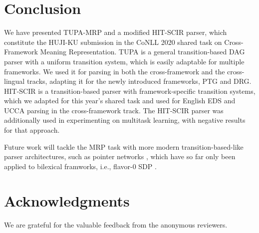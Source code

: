 \documentclass[11pt,a4paper]{article}
\begin{document}
\section{Conclusion}\label{sec:conclusion}
We have presented TUPA-MRP and a modified HIT-SCIR parser, which constitute the HUJI-KU submission in the CoNLL 2020 shared task on Cross-Framework Meaning Representation. TUPA is a general transition-based DAG parser with a uniform transition system, which is easily adaptable for multiple frameworks. We used it for parsing in both the cross-framework and the cross-lingual tracks, adapting it for the newly introduced frameworks, PTG and DRG.  HIT-SCIR is a transition-based parser with framework-specific transition systems, which we adapted for this year's shared task and used for English EDS and UCCA parsing in the cross-framework track. The HIT-SCIR parser was additionally used in experimenting on multitask learning, with negative results for that approach.

Future work will tackle the MRP task with more modern transition-based-like parser architectures, such as pointer networks \cite{ma-etal-2018-stack}, which have so far only been applied to bilexical framworks, i.e., flavor-0 SDP \cite{fernandez-gonzalez-gomez-rodriguez-2020-transition}.


\section*{Acknowledgments}

We are grateful for the valuable feedback from the anonymous reviewers.



\end{document}
